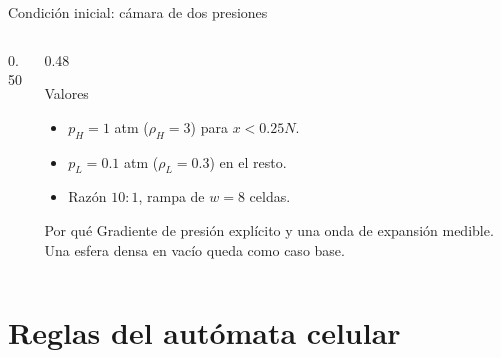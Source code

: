 \documentclass[aspectratio=169]{beamer}
\begin{document}
\begin{frame}{Condición inicial: cámara de dos presiones}
  \begin{columns}[T]
    \begin{column}{0.50\textwidth}
      \centering
    \end{column}
    \begin{column}{0.48\textwidth}
      \begin{block}{Valores}
        \footnotesize
        \begin{itemize}
          \item $p_H=1$ atm ($\rho_H=3$) para $x<0.25N$.
          \item $p_L=0.1$ atm ($\rho_L=0.3$) en el resto.
          \item Razón $10{:}1$, rampa de $w=8$ celdas.
        \end{itemize}
      \end{block}
      \begin{block}{Por qué}
        \footnotesize
        Gradiente de presión explícito y una onda de expansión medible.
        Una \alert{esfera densa} en vacío queda como caso base.
      \end{block}
    \end{column}
  \end{columns}
\end{frame}

\section{Reglas del autómata celular}
\end{document}
